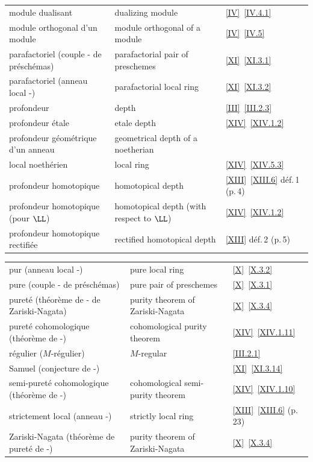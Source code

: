 \begin{footnotesize}
\begin{tabular}{lll}
module dualisant & dualizing module & \ref{IV}~\ref{IV.4.1}\\
module orthogonal d'un module & module orthogonal of a module & \ref{IV}~\ref{IV.5}\\
parafactoriel (couple - de pr\'e\-sch\'emas) & parafactorial pair of preschemes & \ref{XI}~\ref{XI.3.1}\\
parafactoriel (anneau local -) & parafactorial local ring & \ref{XI}~\ref{XI.3.2}\\
profondeur & depth & \ref{III}~\ref{III.2.3}\\
profondeur \'etale & etale depth & \ref{XIV}~\ref{XIV.1.2}\\
profondeur g\'eom\'etrique d'un anneau & geometrical depth of a noetherian &\\
local noeth\'erien & local ring & \ref{XIV}~\ref{XIV.5.3}\\
profondeur homotopique & homotopical depth & \ref{XIII}~\ref{XIII.6} d\'ef.\,1 (p.\,4)\\
profondeur homotopique (pour $\LL$) & homotopical depth (with respect to $\LL$) & \ref{XIV}~\ref{XIV.1.2}\\
profondeur homotopique rectifi\'ee & rectified homotopical depth & \ref{XIII} d\'ef.\,2 (p.\,5)\\
\end{tabular}
\newpage
\begin{tabular}{lll}
pur (anneau local -) & pure local ring & \ref{X}~\ref{X.3.2} \\
pure (couple - de pr\'esch\'emas) & pure pair of preschemes & \ref{X}~\ref{X.3.1}\\
puret\'e (th\'eor\`eme de - de Zariski-Nagata) & purity theorem of Zariski-Nagata & \ref{X}~\ref{X.3.4}\\
puret\'e cohomologique (th\'eor\`eme de -) & cohomological purity theorem & \ref{XIV}~\ref{XIV.1.11}\\
r\'egulier ($M$-r\'egulier) & $M$-regular & \ref{III.2.1}\\
Samuel (conjecture de -) & & \ref{XI}~\ref{XI.3.14}\\
semi-puret\'e cohomologique (th\'eor\`eme de -) & cohomological semi-purity theorem & \ref{XIV}~\ref{XIV.1.10}\\
strictement local (anneau -) & strictly local ring & \ref{XIII}~\ref{XIII.6} (p.\,23)\\
Zariski-Nagata (th\'eor\`eme de puret\'e de -) & purity theorem of Zariski-Nagata & \ref{X}~\ref{X.3.4}
\end{tabular}
\end{footnotesize}

\backmatter

